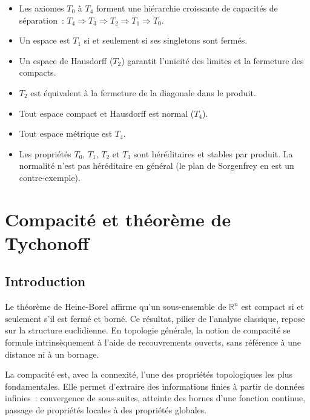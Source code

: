 \documentclass[12pt,a4paper,openany]{book}
\theoremstyle{definition}
\theoremstyle{cours}
\theoremstyle{coursnormal}
\newcommand{\R}{\mathbb{R}}
\begin{document}
\begin{itemize}
  \item Les axiomes $T_0$ à $T_4$ forment une hiérarchie croissante de
    capacités de séparation~: $T_4\Rightarrow T_3\Rightarrow T_2\Rightarrow
    T_1\Rightarrow T_0$.
  \item Un espace est $T_1$ si et seulement si ses singletons sont fermés.
  \item Un espace de Hausdorff ($T_2$) garantit l'unicité des limites et la
    fermeture des compacts.
  \item $T_2$ est équivalent à la fermeture de la diagonale dans le produit.
  \item Tout espace compact et Hausdorff est normal ($T_4$).
  \item Tout espace métrique est $T_4$.
  \item Les propriétés $T_0$, $T_1$, $T_2$ et $T_3$ sont héréditaires et
    stables par produit. La normalité n'est pas héréditaire en général (le plan
    de Sorgenfrey en est un contre-exemple).
\end{itemize}


\chapter{Compacité et théorème de Tychonoff}\label{ch:compacite}

\section*{Introduction}

Le théorème de Heine-Borel affirme qu'un
sous-ensemble de $\R^n$ est compact si et seulement s'il est fermé et borné.
Ce résultat, pilier de l'analyse classique, repose sur la structure
euclidienne. En topologie générale, la notion de compacité se formule
intrinsèquement à l'aide de recouvrements ouverts, sans référence à une
distance ni à un bornage.

\medskip

La compacité est, avec la connexité, l'une des propriétés topologiques les
plus fondamentales. Elle permet d'extraire des informations finies à partir de
données infinies~: convergence de sous-suites, atteinte des bornes d'une
fonction continue, passage de propriétés locales à des propriétés globales.
\end{document}
